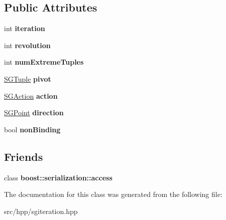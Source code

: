 \subsection*{Public Attributes}
\begin{DoxyCompactItemize}
\item 
\hypertarget{class_s_g_iteration_a44a4f9e3cb074181292ae816b2c28d9e}{int {\bfseries iteration}}\label{class_s_g_iteration_a44a4f9e3cb074181292ae816b2c28d9e}

\item 
\hypertarget{class_s_g_iteration_a21cc5c4fc7c40ff444ac7e3743c13940}{int {\bfseries revolution}}\label{class_s_g_iteration_a21cc5c4fc7c40ff444ac7e3743c13940}

\item 
\hypertarget{class_s_g_iteration_a14ecfb94b3111911d9b0ef545f72e88d}{int {\bfseries num\+Extreme\+Tuples}}\label{class_s_g_iteration_a14ecfb94b3111911d9b0ef545f72e88d}

\item 
\hypertarget{class_s_g_iteration_abdae7d336968af3515e7d9590cbcc46d}{\hyperlink{class_s_g_tuple}{S\+G\+Tuple} {\bfseries pivot}}\label{class_s_g_iteration_abdae7d336968af3515e7d9590cbcc46d}

\item 
\hypertarget{class_s_g_iteration_a200054bd214fbd68e396459eed5c11e5}{\hyperlink{class_s_g_action}{S\+G\+Action} {\bfseries action}}\label{class_s_g_iteration_a200054bd214fbd68e396459eed5c11e5}

\item 
\hypertarget{class_s_g_iteration_ac35e7e3049cd60c695a366cb8f75db37}{\hyperlink{class_s_g_point}{S\+G\+Point} {\bfseries direction}}\label{class_s_g_iteration_ac35e7e3049cd60c695a366cb8f75db37}

\item 
\hypertarget{class_s_g_iteration_a7520e6ea4903e8b32884294a3c65b331}{bool {\bfseries non\+Binding}}\label{class_s_g_iteration_a7520e6ea4903e8b32884294a3c65b331}

\end{DoxyCompactItemize}
\subsection*{Friends}
\begin{DoxyCompactItemize}
\item 
\hypertarget{class_s_g_iteration_ac98d07dd8f7b70e16ccb9a01abf56b9c}{class {\bfseries boost\+::serialization\+::access}}\label{class_s_g_iteration_ac98d07dd8f7b70e16ccb9a01abf56b9c}

\end{DoxyCompactItemize}


The documentation for this class was generated from the following file\+:\begin{DoxyCompactItemize}
\item 
src/hpp/sgiteration.\+hpp\end{DoxyCompactItemize}
